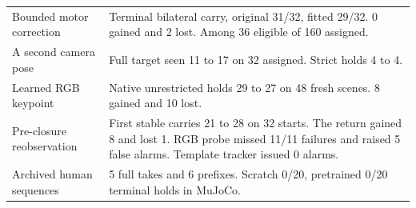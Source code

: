 \documentclass[conference]{IEEEtran}
\begin{document}
\begin{table}[t]
\begin{tabular}{@{}p{}p{}@{}}
Bounded motor correction & Terminal bilateral carry, original 31/32, fitted 29/32. 0 gained and 2 lost. Among 36 eligible of 160 assigned. \\
A second camera pose & Full target seen 11 to 17 on 32 assigned. Strict holds 4 to 4. \\
Learned RGB keypoint & Native unrestricted holds 29 to 27 on 48 fresh scenes. 8 gained and 10 lost. \\
Pre-closure reobservation & First stable carries 21 to 28 on 32 starts. The return gained 8 and lost 1. RGB probe missed 11/11 failures and raised 5 false alarms. Template tracker issued 0 alarms. \\
Archived human sequences & 5 full takes and 6 prefixes. Scratch 0/20, pretrained 0/20 terminal holds in MuJoCo. \\
\hline\end{tabular}
\end{table}


\end{document}
